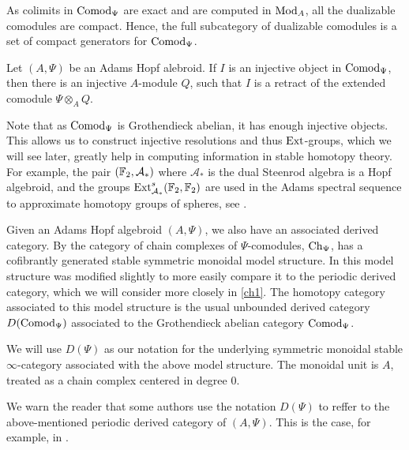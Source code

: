 \begin{remark}
    \label{ch0:rm:dualizables-compact-generators}
    As colimits in $\mathrm{Comod}_\Psi$ are exact and are computed in $\mathrm{Mod}_A$, all the dualizable comodules are compact. Hence, the full subcategory of dualizable comodules is a set of compact generators for $\mathrm{Comod}_\Psi$. 
\end{remark}

\begin{proposition}
    \label{ch0:rm:injective-comodules}
    Let $(A, \Psi)$ be an Adams Hopf alebroid. If $I$ is an injective object in $\mathrm{Comod}_\Psi$, then there is an injective $A$-module $Q$, such that $I$ is a retract of the extended comodule $\Psi\otimes_A Q$. 
\end{proposition}

\begin{remark}
    Note that as $\mathrm{Comod}_{\Psi}$ is Grothendieck abelian, it has enough injective objects. This allows us to construct injective resolutions and thus $\operatorname{Ext}$-groups, which we will see later, greatly help in computing information in stable homotopy theory. For example, the pair $(\mathbb{F}_2, \mathcal{A}_*)$ where $\mathcal{A}_*$ is the dual Steenrod algebra is a Hopf algebroid, and the groups $\operatorname{Ext}^s_{\mathcal{A}_*}(\mathbb{F}_2, \mathbb{F}_2)$ are used in the Adams spectral sequence to approximate homotopy groups of spheres, see \cite{adams_58}. 
\end{remark}

Given an Adams Hopf algebroid $(A, \Psi)$, we also have an associated derived category. By \cite[2.1.2, 2.1.3]{hovey_04} the category of chain complexes of $\Psi$-comodules, $\mathrm{Ch}_\Psi$, has a cofibrantly generated stable symmetric monoidal model structure. In \cite{barnes-roitzheim_2011} this model structure was modified slightly to more easily compare it to the periodic derived category, which we will consider more closely in \cref{ch1}. The homotopy category associated to this model structure is the usual unbounded derived category $D(\mathrm{Comod}_\Psi)$ associated to the Grothendieck abelian category $\mathrm{Comod}_\Psi$. 
 

\begin{notation}
    We will use $D(\Psi)$ as our notation for the underlying symmetric monoidal stable $\infty$-category associated with the above model structure. The monoidal unit is $A$, treated as a chain complex centered in degree $0$.
\end{notation}

\begin{remark}
    We warn the reader that some authors use the notation $D(\Psi)$ to reffer to the above-mentioned periodic derived category of $(A, \Psi)$. This is the case, for example, in \cite{pstragowski_2021}. 
\end{remark}

